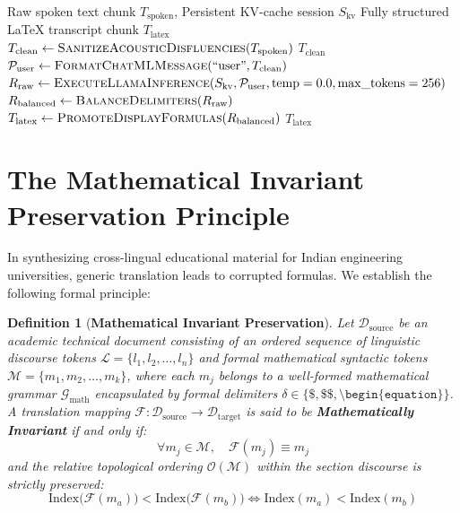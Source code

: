 \documentclass[11pt,a4paper,oneside]{report}
\newtheorem{definition}{Definition}[chapter]
\begin{document}
\begin{algorithm}[H]
\caption{Mathematical Speech-to-LaTeX Transduction with Prompt Caching}
\label{alg:math_transduction}
\begin{algorithmic}[1]
\Require Raw spoken text chunk $T_{\text{spoken}}$, Persistent KV-cache session $S_{\text{kv}}$
\Ensure Fully structured LaTeX transcript chunk $T_{\text{latex}}$
\State $T_{\text{clean}} \gets \Call{SanitizeAcousticDisfluencies}{T_{\text{spoken}}}$
    \State \Return $T_{\text{clean}}$ 
\EndIf
\State $\mathcal{P}_{\text{user}} \gets \Call{FormatChatMLMessage}{\text{``user''}, T_{\text{clean}}}$
\State $R_{\text{raw}} \gets \Call{ExecuteLlamaInference}{S_{\text{kv}}, \mathcal{P}_{\text{user}}, \text{temp}=0.0, \text{max\_tokens}=256}$
\State $R_{\text{balanced}} \gets \Call{BalanceDelimiters}{R_{\text{raw}}}$ 
\State $T_{\text{latex}} \gets \Call{PromoteDisplayFormulas}{R_{\text{balanced}}}$
\State \Return $T_{\text{latex}}$
\end{algorithmic}
\end{algorithm}

\section{The Mathematical Invariant Preservation Principle}
\label{sec:math_invariant}
In synthesizing cross-lingual educational material for Indian engineering universities, generic translation leads to corrupted formulas. We establish the following formal principle:

\begin{definition}[\textbf{Mathematical Invariant Preservation}]
Let $\mathcal{D}_{\text{source}}$ be an academic technical document consisting of an ordered sequence of linguistic discourse tokens $\mathcal{L} = \{l_1, l_2, \dots, l_n\}$ and formal mathematical syntactic tokens $\mathcal{M} = \{m_1, m_2, \dots, m_k\}$, where each $m_j$ belongs to a well-formed mathematical grammar $\mathcal{G}_{\text{math}}$ encapsulated by formal delimiters $\delta \in \{\$, \$\$, \texttt{\textbackslash begin\{equation\}}\}$. A translation mapping $\mathcal{F}: \mathcal{D}_{\text{source}} \to \mathcal{D}_{\text{target}}$ is said to be \textbf{Mathematically Invariant} if and only if:
\begin{equation}
  \forall m_j \in \mathcal{M}, \quad \mathcal{F}(m_j) \equiv m_j
\end{equation}
and the relative topological ordering $\mathcal{O}(\mathcal{M})$ within the section discourse is strictly preserved:
\begin{equation}
  \text{Index}\big(\mathcal{F}(m_a)\big) < \text{Index}\big(\mathcal{F}(m_b)\big) \iff \text{Index}(m_a) < \text{Index}(m_b)
\end{equation}
\end{definition}
\end{document}
